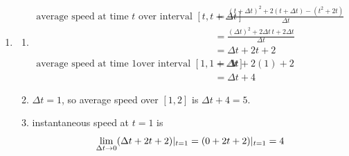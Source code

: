 \begin{enumerate}
    \item 
    \begin{enumerate}
    	\item \begin{align*}
        \text{average speed at time } t \text{ over interval } [t,t+\Delta t]&= \frac{(t+\Delta t)^2 + 2(t+\Delta t) - (t^2 + 2t)}{\Delta t} \\
        &= \frac{ (\Delta t)^2 + 2 \Delta t\, t + 2 \Delta t}{\Delta t} \\
        &= \Delta t + 2t + 2 \\
		\text{average speed at time } 1 \text{over interval } [1,1+\Delta t]
        &= \Delta t + 2(1) + 2 \\ 
        &= \Delta t + 4
        \end{align*}
        \item $\Delta t = 1$, so average speed over $[1,2]$ is $\Delta t+4 = 5$. 
        \item instantaneous speed at $t = 1$ is $$\lim_{\Delta t \rightarrow 0} (\Delta t + 2t + 2 )\huge|_{t = 1} =  (0+2t + 2) \huge|_{t = 1} = 4$$
    \end{enumerate}
\end{enumerate}




